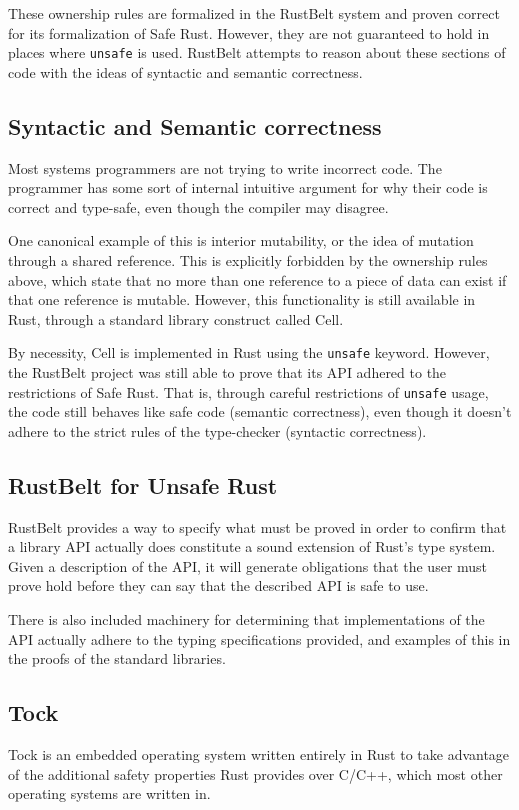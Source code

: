 \documentclass[12pt]{article}
\begin{document}
These ownership rules are formalized in the RustBelt system and proven correct for its formalization of Safe Rust. However, they are not guaranteed to hold in places where \texttt{unsafe} is used. RustBelt attempts to reason about these sections of code with the ideas of syntactic and semantic correctness.

\subsection{Syntactic and Semantic correctness}
Most systems programmers are not trying to write incorrect code. The programmer has some sort of internal intuitive argument for why their code is correct and type-safe, even though the compiler may disagree.

One canonical example of this is interior mutability, or the idea of mutation through a shared reference. This is explicitly forbidden by the ownership rules above, which state that no more than one reference to a piece of data can exist if that one reference is mutable. However, this functionality is still available in Rust, through a standard library construct called Cell.

By necessity, Cell is implemented in Rust using the \texttt{unsafe} keyword. However, the RustBelt project was still able to prove that its API adhered to the restrictions of Safe Rust. That is, through careful restrictions of \texttt{unsafe} usage, the code still behaves like safe code (semantic correctness), even though it doesn't adhere to the strict rules of the type-checker (syntactic correctness).

\subsection{RustBelt for Unsafe Rust}
RustBelt provides a way to specify what must be proved in order to confirm that a library API actually does constitute a sound extension of Rust's type system. Given a description of the API, it will generate obligations that the user must prove hold before they can say that the described API is safe to use.

There is also included machinery for determining that implementations of the API actually adhere to the typing specifications provided, and examples of this in the proofs of the standard libraries.

\subsection{Tock}
Tock is an embedded operating system written entirely in Rust to take advantage of the additional safety properties Rust provides over C/C++, which most other operating systems are written in.
\end{document}
